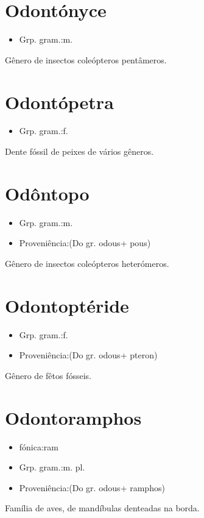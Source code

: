 \section{Odontónyce}
\begin{itemize}
\item {Grp. gram.:m.}
\end{itemize}
Gênero de insectos coleópteros pentâmeros.
\section{Odontópetra}
\begin{itemize}
\item {Grp. gram.:f.}
\end{itemize}
Dente fóssil de peixes de vários gêneros.
\section{Odôntopo}
\begin{itemize}
\item {Grp. gram.:m.}
\end{itemize}
\begin{itemize}
\item {Proveniência:(Do gr. \textunderscore odous\textunderscore  + \textunderscore pous\textunderscore )}
\end{itemize}
Gênero de insectos coleópteros heterómeros.
\section{Odontoptéride}
\begin{itemize}
\item {Grp. gram.:f.}
\end{itemize}
\begin{itemize}
\item {Proveniência:(Do gr. \textunderscore odous\textunderscore  + \textunderscore pteron\textunderscore )}
\end{itemize}
Gênero de fêtos fósseis.
\section{Odontoramphos}
\begin{itemize}
\item {fónica:ram}
\end{itemize}
\begin{itemize}
\item {Grp. gram.:m. pl.}
\end{itemize}
\begin{itemize}
\item {Proveniência:(Do gr. \textunderscore odous\textunderscore  + \textunderscore ramphos\textunderscore )}
\end{itemize}
Família de aves, de mandíbulas denteadas na borda.
